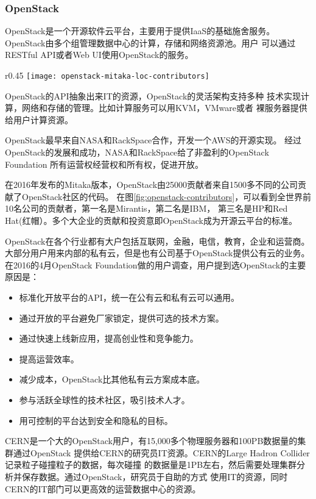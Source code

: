 \subsubsection{OpenStack}
\label{subsubsec:openstack}
OpenStack是一个开源软件云平台，主要用于提供IaaS的基础施舍服务。
OpenStack由多个组管理数据中心的计算，存储和网络资源池。用户
可以通过RESTful API或者Web UI使用OpenStack的服务。
\begin{wrapfigure}{r}{0.45\textwidth}
  \centering
    \texttt{[image: openstack-mitaka-loc-contributors]}
    \caption{OpenStack的Mitaka版本贡献者排名，按Lines of Code排序。\cite{stackalytics_mitaka_loc}}
  \label{fig:openstack-contributors}
\end{wrapfigure}
OpenStack的API抽象出来IT的资源，OpenStack的灵活架构支持多种
技术实现计算，网络和存储的管理。比如计算服务可以用KVM，VMware或者
裸服务器提供给用户计算资源。

OpenStack最早来自NASA和RackSpace合作，开发一个AWS的开源实现。
经过OpenStack的发展和成功，NASA和RackSpace给了非盈利的OpenStack Foundation
所有运营权经营权和所有权，促进开放。


在2016年发布的Mitaka版本，OpenStack由25000贡献者来自1500多不同的公司贡献了OpenStack社区的代码。\cite{stackalytics_mitaka_loc}
在图\ref{fig:openstack-contributors}，可以看到全世界前10名公司的贡献者，第一名是Mirantis，第二名是IBM，
第三名是HP和Red Hat(红帽）。多个大企业的贡献和投资意即OpenStack成为开源云平台的标准。

OpenStack在各个行业都有大户包括互联网，金融，电信，教育，企业和运营商。
大部分用户用来内部的私有云，但是也有公司基于OpenStack提供公有云的业务。
在2016的4月OpenStack Foundation做的用户调查，用户提到选OpenStack的主要原因是：
\begin{itemize}
  \item 标准化开放平台的API，统一在公有云和私有云可以通用。
  \item 通过开放的平台避免厂家锁定，提供可选的技术方案。
  \item 通过快速上线新应用，提高创业性和竞争能力。
  \item 提高运营效率。
  \item 减少成本，OpenStack比其他私有云方案成本底。
  \item 参与活跃全球性的技术社区，吸引技术人才。
  \item 用可控制的平台达到安全和隐私的目标。
\end{itemize}
CERN是一个大的OpenStack用户，有15,000多个物理服务器和100PB数据量的集群通过OpenStack
提供给CERN的研究员IT资源。CERN的Large Hadron Collider记录粒子碰撞粒子的数据，每次碰撞
的数据量是1PB左右，然后需要处理集群分析并保存数据。通过OpenStack，研究员于自助的方式
使用IT的资源，同时CERN的IT部门可以更高效的运营数据中心的资源。\cite{cern_user_story}

